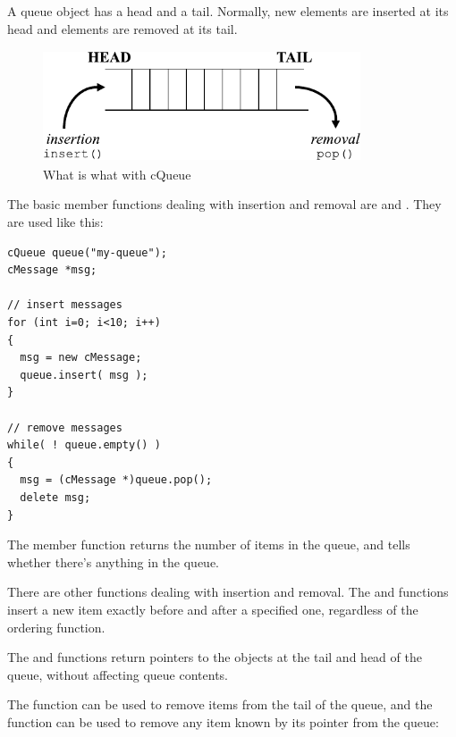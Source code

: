 A queue object has a head and a tail. Normally, new elements
are inserted at its head and elements are removed at its tail.


\begin{figure}[htbp]
  \begin{center}
    \includegraphics[width=3.703in, height=1.303in]{figures/usmanFig10}
    \caption{What is what with cQueue}
    \label{fig:ch-sim-lib:cqueue}
  \end{center}
\end{figure}

The basic  member functions dealing with insertion and removal
are  and . They are used
like this:

\begin{verbatim}
cQueue queue("my-queue");
cMessage *msg;

// insert messages
for (int i=0; i<10; i++)
{
  msg = new cMessage;
  queue.insert( msg );
}

// remove messages
while( ! queue.empty() )
{
  msg = (cMessage *)queue.pop();
  delete msg;
}
\end{verbatim}


The  member function returns the number of items in the
queue, and  tells whether there's anything in the queue.

There are other functions dealing with insertion and removal.  The
 and  functions insert a
new item exactly before and after a specified one, regardless of the
ordering function.

The  and  functions return pointers to the objects
at the tail and head of the queue, without affecting queue contents.



The  function can be used to remove items from the
tail of the queue, and the  function can be
used to remove any item known by its pointer from the queue:





